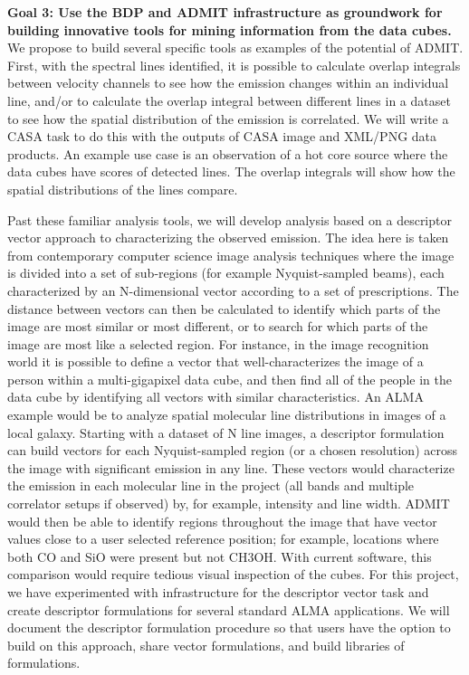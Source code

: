 \noindent
{\bf Goal 3: Use the BDP and ADMIT infrastructure as groundwork for building innovative 
tools for mining information from the data cubes.} We propose to build several specific 
tools as examples of the potential of ADMIT. First, with the spectral lines identified, 
it is possible to calculate overlap integrals between velocity channels to see how the 
emission changes within an individual line, and/or to calculate the overlap integral 
between different lines in a dataset to see how the spatial distribution of the emission 
is correlated. We will write a CASA task to do this with the outputs of CASA image and 
XML/PNG data products. An example use case is an observation of a hot core source 
where the data cubes have scores of detected lines. The overlap integrals will show 
how the spatial distributions of the lines compare.

Past these familiar analysis tools, we will develop analysis based on a descriptor vector 
approach to characterizing the observed emission. The idea here is taken from contemporary 
computer science image analysis techniques where the image is divided into a set of 
sub-regions (for example Nyquist-sampled beams), each characterized by an N-dimensional 
vector according to a set of prescriptions. The distance between vectors can then be 
calculated to identify which parts of the image are most similar or most different, or to 
search for which parts of the image are most like a selected region. For instance, in the 
image recognition world it is possible to define a vector that well-characterizes the 
image of a person within a multi-gigapixel data cube, and then find all of the people 
in the data cube by identifying all vectors with similar characteristics. An ALMA example 
would be to analyze spatial molecular line distributions in images of a local galaxy. 
Starting with a dataset of N line images, a descriptor formulation can build vectors 
for each Nyquist-sampled region (or a chosen resolution) across the image with significant 
emission in any line.  These vectors would characterize the emission in each molecular 
line in the project (all bands and multiple correlator setups if observed) by, 
for example, intensity and line width.  ADMIT would then be able to identify regions 
throughout the image that have vector values close to a user selected reference position; 
for example, locations where both CO and SiO were present but not CH3OH. With current software, 
this comparison would require tedious visual inspection of the cubes. For this project, 
we have experimented with infrastructure for the descriptor vector task and create descriptor 
formulations for several standard ALMA applications. We will document the descriptor 
formulation procedure so that users have the option to build on this approach, share 
vector formulations, and build libraries of formulations.

